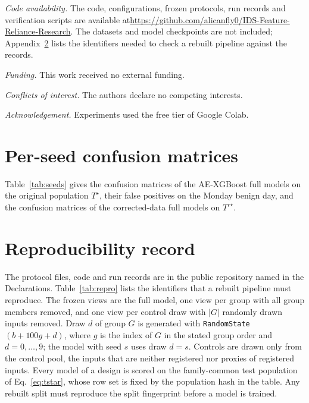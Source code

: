 \documentclass[journal]{IEEEtran}
\newcommand{\Tstar}{T^{\star}}
\begin{document}
\textit{Code availability.} The code, configurations, frozen protocols, run records and verification
scripts are available at\newline\url{https://github.com/alicanfly0/IDS-Feature-Reliance-Research}. The
datasets and model checkpoints are not included; Appendix~\ref{app:repro} lists the identifiers
needed to check a rebuilt pipeline against the records.

\textit{Funding.} This work received no external funding.

\textit{Conflicts of interest.} The authors declare no competing interests.

\textit{Acknowledgement.} Experiments used the free tier of Google Colab.




\appendices
\section{Per-seed confusion matrices}
Table~\ref{tab:seeds} gives the confusion matrices of the AE-XGBoost full models on the original
population $\Tstar$, their false positives on the Monday benign day, and the confusion matrices of the
corrected-data full models on $T'^\star$.

\begin{table}[!ht]
\centering
\caption{\upshape AE-XGBoost full models per seed. Positive class: DDoS.}
\label{tab:seeds}
\footnotesize\setlength{\tabcolsep}{2.6pt}

\end{table}

\section{Reproducibility record}
\label{app:repro}
The protocol files, code and run records are in the public repository named in the Declarations.
Table~\ref{tab:repro} lists the identifiers that a rebuilt pipeline must
reproduce. The frozen views are the full model, one view per group with all group members removed,
and one view per control draw with $|G|$ randomly drawn inputs removed. Draw $d$ of group $G$ is
generated with \texttt{RandomState}$(b+100g+d)$, where $g$ is the index of $G$ in the stated group
order and $d=0,\dots,9$; the model with seed $s$ uses draw $d=s$. Controls are drawn only from the
control pool, the inputs that are neither registered nor proxies of registered inputs. Every model
of a design is scored on the family-common test population of Eq.~\eqref{eq:tstar}, whose row set
is fixed by the population hash in the table. Any rebuilt split must reproduce the split
fingerprint before a model is trained.
\end{document}
